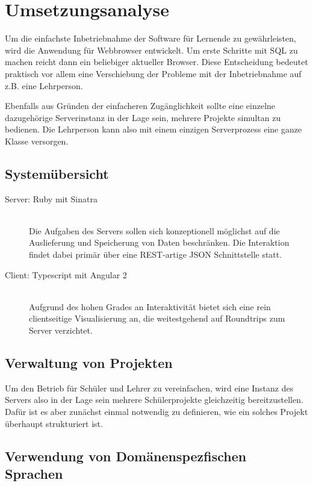 \documentclass[paper=a4,fontsize=11pt,parskip=half]{scrartcl}
\begin{document}
\section{Umsetzungsanalyse}
\label{sec:implementation-analysis}


Um die einfachste Inbetriebnahme der Software für Lernende zu gewährleisten, wird die Anwendung für Webbrowser entwickelt. Um erste Schritte mit SQL zu machen reicht dann ein beliebiger aktueller Browser. Diese Entscheidung bedeutet praktisch vor allem eine Verschiebung der Probleme mit der Inbetriebnahme auf z.B. eine Lehrperson.

Ebenfalls aus Gründen der einfacheren Zugänglichkeit sollte eine einzelne dazugehörige Serverinstanz in der Lage sein, mehrere Projekte simultan zu bedienen. Die Lehrperson kann also mit einem einzigen Serverprozess eine ganze Klasse versorgen.

\subsection{Systemübersicht}

\begin{description}
\item[Server: Ruby mit Sinatra] \hfill\\
  Die Aufgaben des Servers sollen sich konzeptionell möglichst auf die Auslieferung und Speicherung von Daten beschränken. Die Interaktion findet dabei primär über eine REST-artige JSON Schnittstelle statt.
\item[Client: Typescript mit Angular 2] \hfill\\
  Aufgrund des hohen Grades an Interaktivität bietet sich eine rein clientseitige Visualisierung an, die weitestgehend auf Roundtrips zum Server verzichtet.
\end{description}

\subsection{Verwaltung von Projekten}

Um den Betrieb für Schüler und Lehrer zu vereinfachen, wird eine Instanz des Servers also in der Lage sein mehrere Schülerprojekte gleichzeitig bereitzustellen. Dafür ist es aber zunächst einmal notwendig zu definieren, wie ein solches Projekt überhaupt strukturiert ist.

\subsection{Verwendung von Domänenspezfischen Sprachen}
\end{document}
